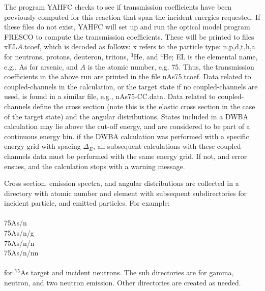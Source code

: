 \documentclass[
10pt,
showpacs,preprintnumbers,nofootinbib,
amsmath,amssymb,
aps,prc,groupedaddress,superscriptaddress,
notitlepage,showkeys
]{revtex4-1}
\begin{document}
The program YAHFC checks to see if transmission coefficients have been previously computed for this reaction that span the incident energies requested. If these files do not exist, YAHFC will set up and run the optical model program FRESCO to compute the transmission coefficients. These will be printed to files xEL$A$.tcoef, which is decoded as follows: x refers to the particle type: n,p,d,t,h,a for neutrons, protons, deuteron, tritons, $^3$He, and $^4$He; EL is the elemental name, e.g., As for arsenic, and $A$ is the atomic number, e.g. 75. Thus, the transmission coefficients in the above run are printed in the file nAs75.tcoef. Data related to coupled-channels in the calculation, or the target state if no coupled-channels are used, is found in a similar file, e.g., nAs75-CC.data.  Data related to coupled-channels define the cross section (note this is the elastic cross section in the case of the target state) and the angular distributions. States included in a DWBA calculation may lie above the cut-off energy, and are considered to be part of a continuous energy bin. if the DWBA calculation was performed with a specific energy grid with spacing $\Delta_E$, all subsequent calculations with these coupled-channels data must be performed with the same energy grid. If not, and error ensues, and the calculation stops with a warning message.

Cross section, emission spectra, and angular distributions are collected in a directory with atomic number and element with subsequent subdirectories for incident particle, and emitted particles. For example:\\
\\
75As/n\\
75As/n/g\\
75As/n/n\\
75As/n/nn\\
\\
for $^{75}$As target and incident neutrons. The sub directories are for gamma, neutron, and two neutron emission. Other directories are created as needed.
\end{document}

